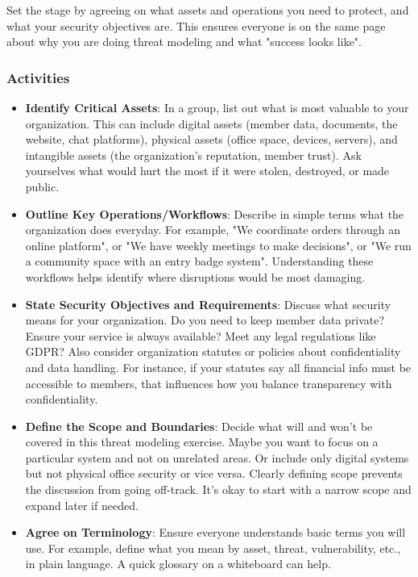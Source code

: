 Set the stage by agreeing on what assets and operations you need to protect, and
what your security objectives are. This ensures everyone is on the same page
about why you are doing threat modeling and what "success looks like". 

\subsubsection{Activities}

\begin{itemize}
    \item \textbf{Identify Critical Assets}: In a group, list out what is most
valuable to your organization. This can include digital assets (member data,
documents, the website, chat platforms), physical assets (office space, devices,
servers), and intangible assets (the organization's reputation, member trust).
Ask yourselves what would hurt the most if it were stolen, destroyed, or made
public.
    \item \textbf{Outline Key Operations/Workflows}: Describe in simple terms
what the organization does everyday. For example, "We coordinate orders through an
online platform", or "We have weekly meetings to make decisions", or "We run a
community space with an entry badge system". Understanding these workflows helps
identify where disruptions would be most damaging.
    \item \textbf{State Security Objectives and Requirements}: Discuss what
security means for your organization. Do you need to keep member data private? Ensure
your service is always available? Meet any legal regulations like
GDPR? Also consider organization statutes or policies about confidentiality and data
handling. For instance, if your statutes say all financial info must be accessible
to members, that influences how you balance transparency with confidentiality.
    \item \textbf{Define the Scope and Boundaries}: Decide what will and won't
be covered in this threat modeling exercise. Maybe you want to focus on a
particular system and not on unrelated areas.
Or include only digital systems but not physical office
security or vice versa. Clearly defining scope prevents the discussion from
going off-track. It's okay to start with a narrow scope and expand later if needed.
    \item \textbf{Agree on Terminology}: Ensure everyone understands basic terms
you will use. For example, define what you mean by asset, threat, vulnerability,
etc., in plain language. A quick glossary on a whiteboard can help.
\end{itemize}

